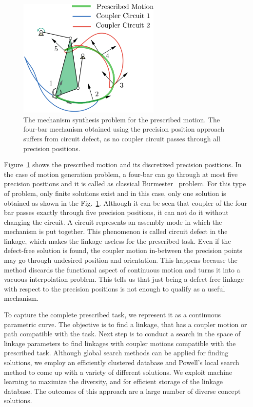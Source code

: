 \documentclass{article}
\begin{document}
\begin{itemize}
\begin{figure}
\centering
\includegraphics[width=200pt]{fig_circuit_defect.eps}
  \caption{The mechanism synthesis problem for the prescribed motion.
  The four-bar mechanism obtained using the precision position approach suffers from circuit defect, as no coupler circuit passes through all precision positions.}
\label{circuit_defect}
\end{figure}

Figure~\ref{circuit_defect} shows the prescribed motion and its discretized precision positions.
In the case of motion generation problem, a four-bar can go through at most five precision positions and it is called as classical Burmester~\cite{Burmester86} problem.
For this type of problem, only finite solutions exist and in this case, only one solution is obtained as shown in the Fig.~\ref{circuit_defect}.
Although it can be seen that coupler of the four-bar passes exactly through five precision positions, it can not do it without changing the circuit.
A circuit represents an assembly mode in which the mechanism is put together.
This phenomenon is called circuit defect in the linkage, which makes the linkage useless for the prescribed task.
Even if the defect-free solution is found, the coupler motion in-between the precision points may go through undesired position and orientation.
This happens because the method discards the functional aspect of continuous motion and turns it into a vacuous interpolation problem.
This tells us that just being a defect-free linkage with respect to the precision positions is not enough to qualify as a useful mechanism.

To capture the complete prescribed task, we represent it as a continuous parametric curve.
The objective is to find a linkage, that has a coupler motion or path compatible with the task.
Next step is to conduct a search in the space of linkage parameters to find linkages with coupler motions compatible with the prescribed task.
Although global search methods can be applied for finding solutions, we employ an efficiently clustered database and Powell's local search method to come up with a variety of different solutions.
We exploit machine learning to maximize the diversity, and for efficient storage of the linkage database.
The outcomes of this approach are a large number of diverse concept solutions.


\end{itemize}
\end{document}
